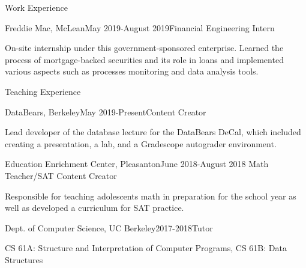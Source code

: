 \documentclass{resume} %
\begin{document}

\begin{rSection}{Work Experience}

\begin{rSubsection}{Freddie Mac, McLean}{May 2019-August 2019}{Financial Engineering Intern}{}
\item On-site internship under this government-sponsored enterprise. Learned the process of mortgage-backed securities and its role in loans and implemented various aspects such as processes monitoring and data analysis tools.
\end{rSubsection}


\end{rSection}



\begin{rSection}{Teaching Experience} 
\begin{rSubsection}{DataBears, Berkeley}{May 2019-Present}{Content Creator}{}
\item Lead developer of the database lecture for the DataBears DeCal, which included creating a presentation, a lab, and a Gradescope autograder environment.
\end{rSubsection}

\begin{rSubsection}{Education Enrichment Center, Pleasanton}{June 2018-August 2018 }{Math Teacher/SAT Content Creator}{}
\item Responsible for teaching adolescents math in preparation for the school year as well as developed a curriculum for SAT practice.
\end{rSubsection}

\begin{rSubsection}{Dept. of Computer Science, UC Berkeley}{2017-2018}{Tutor}{}
\item CS 61A: Structure and Interpretation of Computer Programs, CS 61B: Data Structures
\end{rSubsection}
\end{rSection}

\newpage
\end{document}

